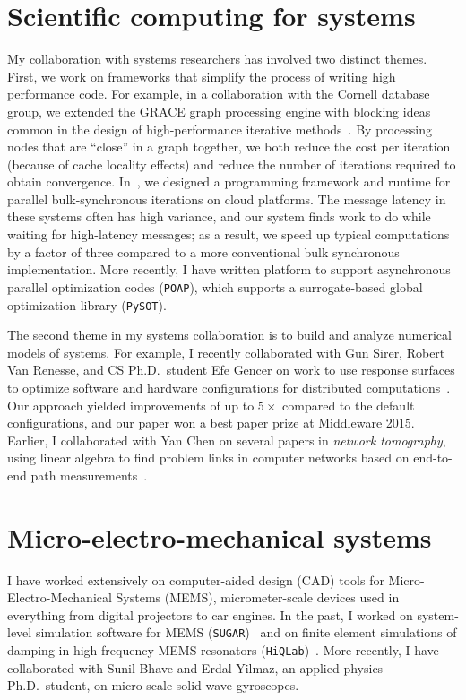 \documentclass[11pt]{amsart}
\begin{document}
\section{Scientific computing for systems}
\label{sec-sc-systems}

My collaboration with systems researchers has involved two distinct
themes. First, we work on frameworks that simplify the process of
writing high performance code.  For example, in a collaboration with the
Cornell database group, we extended the GRACE graph processing engine
with blocking ideas common in the design of high-performance iterative
methods~\cite{2013-blockgrace}.  By processing nodes that are ``close''
in a graph together, we both reduce the cost per iteration (because of
cache locality effects) and reduce the number of iterations required to
obtain convergence.  In~\cite{2011-socc}, we designed a programming
framework and runtime for parallel bulk-synchronous iterations on cloud
platforms.  The message latency in these systems often has high
variance, and our system finds work to do while waiting for high-latency
messages; as a result, we speed up typical computations by a factor of
three compared to a more conventional bulk synchronous implementation.
More recently, I have written platform to support asynchronous parallel
optimization codes ({\tt POAP}), which supports a surrogate-based global
optimization library ({\tt PySOT}).

The second theme in my systems collaboration is to build and analyze
numerical models of systems.  For example, I recently collaborated with Gun Sirer, Robert Van Renesse, and CS Ph.D.~student Efe Gencer on
work to use response surfaces to optimize software and hardware
configurations for distributed computations~\cite{2015-middleware}.  Our
approach yielded improvements of up to $5 \times$ compared to the
default configurations, and our paper won a best paper prize at
Middleware 2015.  Earlier, I collaborated with Yan Chen on several papers
in {\em network tomography},
using linear algebra to find problem links in computer networks based
on end-to-end path
measurements~\cite{2009-tons,2007-tons,2006-sigcomm,2006-sigmetrics,2004-sigcomm,2003-imc}.

\section{Micro-electro-mechanical systems}
\label{sec-engineering}

I have worked extensively on computer-aided design (CAD) tools for
Micro-Electro-Mechanical Systems (MEMS), micrometer-scale devices used
in everything from digital projectors to car engines.  In the past, I
worked on system-level simulation software for MEMS
({\tt SUGAR})~\cite{2002-mems,2001-sugar,2001-msm,2000-mems}
and on finite element simulations of damping in high-frequency
MEMS resonators
({\tt HiQLab})~\cite{2012-mems-opt,2005-sensors,2005-ijnme,2005-mems,2004-para}.
More recently, I have collaborated with Sunil Bhave and
Erdal Yilmaz, an applied physics Ph.D.~student, on micro-scale
solid-wave gyroscopes.
\end{document}
